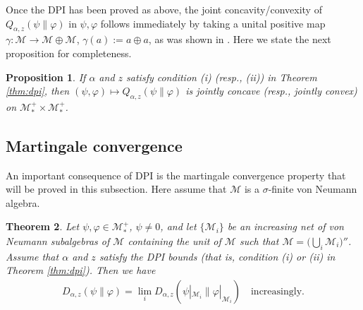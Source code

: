 \documentclass[12pt]{article}
\newtheorem{theorem}{Theorem}[section]
\newtheorem{prop}[theorem]{Proposition}
\theoremstyle{definition}
\theoremstyle{remark}
\numberwithin{equation}{section}
\def\cM{\mathcal M}
\def\Me{\mathcal M}
\def\ffi{\varphi}
\begin{document}
Once the DPI has been proved as above, the joint concavity/convexity of $Q_{\alpha,z}(\psi\|\ffi)$ in $\psi,\ffi$
follows immediately by taking a unital positive map $\gamma:\Me\to\Me\oplus\Me$, $\gamma(a):=a\oplus a$,
as was shown in \cite[Theorem 1(ix)]{kato2023onrenyi}. Here we state the next proposition for completeness.

\begin{prop}\label{prop:jointconv}
If $\alpha$ and $z$ satisfy condition (i) (resp., (ii)) in Theorem \ref{thm:dpi}, then
$(\psi,\ffi)\mapsto Q_{\alpha,z}(\psi\|\ffi)$ is jointly concave (resp., jointly convex) on $\Me_*^+\times\Me_*^+$.
\end{prop}

\subsection{Martingale convergence}

An important consequence of DPI is the martingale convergence property that will be
proved in this subsection. Here assume that $\cM$ is a $\sigma$-finite von Neumann algebra.

\begin{theorem}\label{thm:martingale}
Let $\psi,\varphi\in \Me_*^+$, $\psi\ne 0$, and let $\{\cM_i\}$ be an increasing net of von Neumann
subalgebras of $\cM$ containing the unit of $\cM$ such that $\cM=\bigl(\bigcup_i\cM_i\bigr)''$.
Assume that $\alpha$ and $z$ satisfy the DPI bounds (that is, condition (i) or (ii) in
Theorem \ref{thm:dpi}). Then we have
\begin{align}\label{eq:martingale}
D_{\alpha,z}(\psi\|\ffi)=\lim_iD_{\alpha,z}(\psi|_{\cM_i}\|\ffi|_{\cM_i})
\quad\mbox{increasingly}.
\end{align}
\end{theorem}
\end{document}
